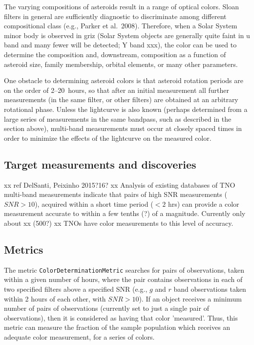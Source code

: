 The varying compositions of asteroids result
in a range of optical colors. Sloan filters
in general are sufficiently diagnostic to
discriminate among different compositional
class 
(e.g., Parker et al.\ 2008).
Therefore, when a Solar System
minor body is observed in griz (Solar System
objects are generally quite faint in u band
and many fewer will be detected; Y band xxx),
the color can be used to determine the composition
and, downstream, composition as a function of
asteroid size, family membership, orbital
elements, or many other parameters.


One obstacle to determining asteroid colors
is that asteroid rotation periods are
on the order of 2--20~hours, so that after
an initial measurement all further
measurements (in the same filter, or other
filters) are obtained at an arbitrary rotational
phase. Unless the lightcurve is also known (perhaps determined from a
large series of measurements in the same bandpass, such as described
in the section above), multi-band measurements must occur at closely
spaced times in order to minimize the effects of the lightcurve on the
measured color.


\subsection{Target measurements and discoveries}
\label{sec:\secname:targets}

xx ref DelSanti, Peixinho 2015?16? xx 
Analysis of existing databases of TNO multi-band measurements indicate
that pairs of high SNR measurements ($SNR>10$), acquired within a short time
period ($<2$ hrs) can provide a color measurement accurate to within a
few tenths (?) of a magnitude. Currently only about xx (500?) xx TNOs
have color measurements to this level of accuracy.



\subsection{Metrics}
\label{sec:\secname:metrics}

The metric {\tt ColorDeterminationMetric} searches for pairs of
observations, taken within a given number of hours, where the pair
contains observations in each of two specified filters above a
specified SNR (e.g., $g$ and $r$ band observations taken within 2
hours of each other, with $SNR>10$). If an object receives a minimum
number of pairs of observations (currently set to just a single pair
of observations), then it is considered as having that color
'measured'. Thus, this metric can measure the fraction of the sample
population which receives an adequate color measurement, for a series
of colors.


